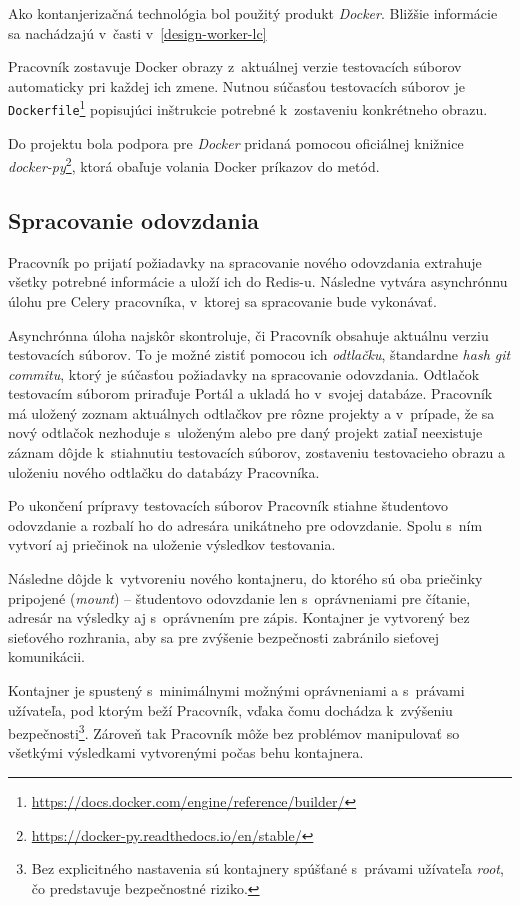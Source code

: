 \documentclass[
  digital, %
  oneside, %
  table,   %
  lof,     %
  lot,   %
]{fithesis3}
\newcommand*{\fullref}[1]{\hyperref[{#1}]{\ref*{#1} \nameref*{#1}}}
\newcommand*{\footurl}[1]{\footnote{\url{#1}}}
\begin{document}
Ako kontanjerizačná technológia bol použitý produkt \emph{Docker}. Bližšie informácie sa nachádzajú v~časti v~\fullref{design-worker-lc}

Pracovník zostavuje Docker obrazy z~aktuálnej verzie testovacích súborov automaticky pri každej ich zmene. Nutnou súčasťou testovacích súborov je \texttt{Dockerfile}\footurl{https://docs.docker.com/engine/reference/builder/} popisujúci inštrukcie potrebné k~zostaveniu konkrétneho obrazu.

Do projektu bola podpora pre \emph{Docker} pridaná pomocou oficiálnej knižnice \emph{docker-py}\footurl{https://docker-py.readthedocs.io/en/stable/}, ktorá obaľuje volania Docker príkazov do metód.

\subsection{Spracovanie odovzdania}

Pracovník po prijatí požiadavky na spracovanie nového odovzdania extrahuje všetky potrebné informácie a uloží ich do Redis-u. Následne vytvára asynchrónnu úlohu pre Celery pracovníka, v~ktorej sa spracovanie bude vykonávať.

Asynchrónna úloha najskôr skontroluje, či Pracovník obsahuje aktuálnu verziu testovacích súborov. To je možné zistiť pomocou ich \emph{odtlačku}, štandardne \emph{hash git commitu}, ktorý je súčasťou požiadavky na spracovanie odovzdania. Odtlačok testovacím súborom priraďuje Portál a ukladá ho v~svojej databáze. Pracovník má uložený zoznam aktuálnych odtlačkov pre rôzne projekty a v~prípade, že sa nový odtlačok nezhoduje s~uloženým alebo pre daný projekt zatiaľ neexistuje záznam dôjde k~stiahnutiu testovacích súborov, zostaveniu testovacieho obrazu a uloženiu nového odtlačku do databázy Pracovníka. 

Po ukončení prípravy testovacích súborov Pracovník stiahne študentovo odovzdanie a rozbalí ho do adresára unikátneho pre odovzdanie. Spolu s~ním vytvorí aj priečinok na uloženie výsledkov testovania. 

Následne dôjde k~vytvoreniu nového kontajneru, do ktorého sú oba priečinky pripojené (\emph{mount}) -- študentovo odovzdanie len s~oprávneniami pre čítanie, adresár na výsledky aj s~oprávnením pre zápis. Kontajner je vytvorený bez sieťového rozhrania, aby sa pre zvýšenie bezpečnosti zabránilo sieťovej komunikácii.

Kontajner je spustený s~minimálnymi možnými oprávneniami a s~právami užívateľa, pod ktorým beží Pracovník, vďaka čomu dochádza k~zvýšeniu bezpečnosti\footnote{Bez explicitného nastavenia sú kontajnery spúšťané s~právami užívateľa \emph{root}, čo predstavuje bezpečnostné riziko.}. Zároveň tak Pracovník môže bez problémov manipulovať so všetkými výsledkami vytvorenými počas behu kontajnera.
\end{document}
